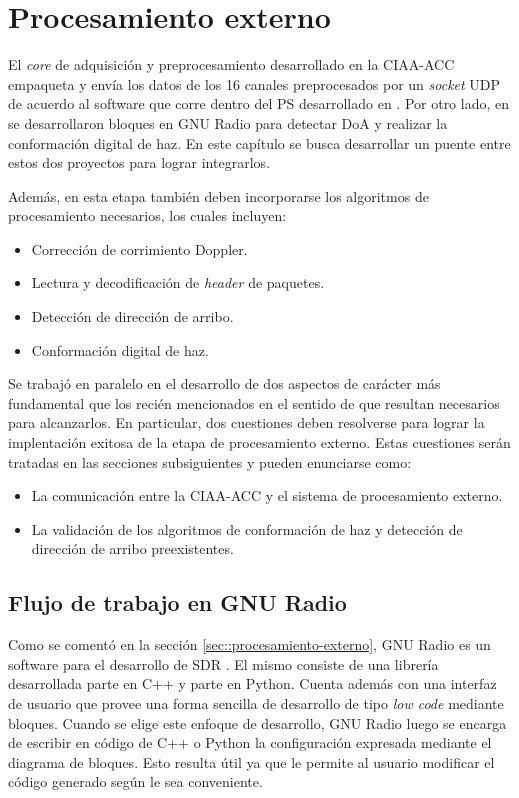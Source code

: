 \documentclass[../../main.tex]{subfiles}
\begin{document}
\graphicspath{{./figures}}
\chapter{Procesamiento externo}\label{cap::gnu-radio}
El \textit{core} de adquisición y preprocesamiento desarrollado en la CIAA-ACC empaqueta y envía los datos de los 16 canales preprocesados por un \textit{socket} UDP de acuerdo al software que corre dentro del PS desarrollado en \cite{proyecto-jose}. Por otro lado, en \cite{proyecto-grigo} se desarrollaron bloques en GNU Radio para detectar DoA y realizar la conformación digital de haz. En este capítulo se busca desarrollar un puente entre estos dos proyectos para lograr integrarlos.

Además, en esta etapa también deben incorporarse los algoritmos de procesamiento necesarios, los cuales incluyen:
\begin{itemize}
    \item Corrección de corrimiento Doppler.
    \item Lectura y decodificación de \textit{header} de paquetes.
    \item Detección de dirección de arribo.
    \item Conformación digital de haz.
\end{itemize}

Se trabajó en paralelo en el desarrollo de dos aspectos de carácter más fundamental que los recién mencionados en el sentido de que resultan necesarios para alcanzarlos. En particular, dos cuestiones deben resolverse para lograr la implentación exitosa de la etapa de procesamiento externo. Estas cuestiones serán tratadas en las secciones subsiguientes y pueden enunciarse como:
\begin{itemize}
    \item La comunicación entre la CIAA-ACC y el sistema de procesamiento externo.
    \item La validación de los algoritmos de conformación de haz y detección de dirección de arribo preexistentes.
\end{itemize}

\section{Flujo de trabajo en GNU Radio}
Como se comentó en la sección \ref{sec::procesamiento-externo}, GNU Radio es un software para el desarrollo de SDR \cite{GNURadio}. El mismo consiste de una librería desarrollada parte en C++ y parte en Python. Cuenta además con una interfaz de usuario que provee una forma sencilla de desarrollo de tipo \textit{low code} mediante bloques. Cuando se elige este enfoque de desarrollo, GNU Radio luego se encarga de escribir en código de C++ o Python la configuración expresada mediante el diagrama de bloques. Esto resulta útil ya que le permite al usuario modificar el código generado según le sea conveniente.
\end{document}
